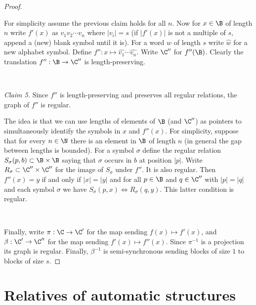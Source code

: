 \begin{proof}
\

For simplicity assume the previous claim holds for all $n$. Now for $x \in \B$ of length $n$ write $f'(x) $ as $v_1 v_2 \cdots v_n$ where $|v_i| = s$ (if $|f'(x)|$ is not a multiple of $s$, append
a (new) blank symbol until it is). For a word $w$ of length $s$ write $\widehat{w}$ for a new alphabet symbol. 
Define $f'':x \mapsto \widehat{v_1} \cdots \widehat{v_n}$. Write $\C''$ for $f''(\B)$. Clearly 
the translation $f'':\B \to \C''$ is length-preserving.

\

\noindent
{\em Claim 5.} Since $f''$ is length-preserving and preserves all regular relations, the graph of $f''$ is regular. 

The idea is that we can use lengths of elements of $\B$ (and $\C''$) as pointers to simultaneously identify the symbols in $x$ and $f''(x)$. For simplicity, suppose that for every $n \in \N$ there is an element in $\B$  of length $n$ (in general the gap between lengths is bounded). For a symbol $\sigma$ define the regular relation $S_\sigma(p,b) \subset \B \times \B$ saying that $\sigma$ occurs in $b$ at position $|p|$. Write $R_\sigma \subset \C'' \times \C''$ for the image of $S_\sigma$ under $f''$. It is also regular. Then $f''(x) = y$ if and only if $|x| = |y|$ and for all $p \in \B$
and $q \in \C''$ with $|p| = |q|$ and each symbol $\sigma$ we have $S_\sigma(p,x) \iff R_\sigma(q,y)$. This latter condition is regular.

\


Finally, write $\pi:\C \to \C'$ for the map sending $f(x) \mapsto f'(x)$, and $\beta:\C' \to \C''$ for the map sending $f'(x) \mapsto f''(x)$.
Since $\pi^{-1}$ is a projection its graph is regular.
Finally, $\beta^{-1}$ is semi-synchronous sending blocks of size $1$ to blocks of size $s$.
\end{proof}



\section{Relatives of automatic structures}  \label{AS:sec:gen} %


